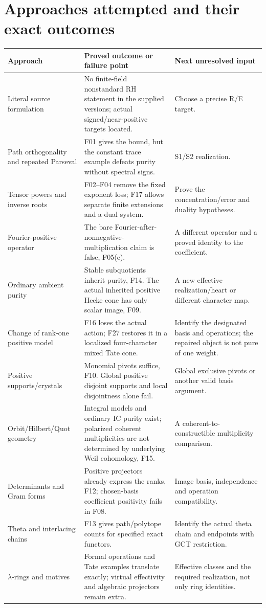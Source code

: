 \section{Approaches attempted and their exact outcomes}
{\small\begin{longtable}{p{.23\linewidth}p{.40\linewidth}p{.29\linewidth}}
\toprule Approach&Proved outcome or failure point&Next unresolved input\\\midrule\endhead
Literal source formulation&No finite-field nonstandard RH statement in the supplied versions; actual signed/near-positive targets located.&Choose a precise R/E target.\\
Path orthogonality and repeated Parseval&F01 gives the bound, but the constant trace example defeats purity without spectral signs.&S1/S2 realization.\\
Tensor powers and inverse roots&F02--F04 remove the fixed exponent loss; F17 allows separate finite extensions and a dual system.&Prove the concentration/error and duality hypotheses.\\
Fourier-positive operator&The bare Fourier-after-nonnegative-multiplication claim is false, F05(e).&A different operator and a proved identity to the coefficient.\\
Ordinary ambient purity&Stable subquotients inherit purity, F14. The actual inherited positive Hecke cone has only scalar image, F09.&A new effective realization/heart or different character map.\\
Change of rank-one positive model&F16 loses the actual action; F27 restores it in a localized four-character mixed Tate cone.&Identify the designated basis and operations; the repaired object is not pure of one weight.\\
Positive supports/crystals&Monomial pivots suffice, F10. Global positive disjoint supports and local disjointness alone fail.&Global exclusive pivots or another valid basis argument.\\
Orbit/Hilbert/Quot geometry&Integral models and ordinary IC purity exist; polarized coherent multiplicities are not determined by underlying Weil cohomology, F15.&A coherent-to-constructible multiplicity comparison.\\
Determinants and Gram forms&Positive projectors already express the ranks, F12; chosen-basis coefficient positivity fails in F08.&Image basis, independence and operation compatibility.\\
Theta and interlacing chains&F13 gives path/polytope counts for specified exact functors.&Identify the actual theta chain and endpoints with GCT restriction.\\
$\lambda$-rings and motives&Formal operations and Tate examples translate exactly; virtual effectivity and algebraic projectors remain extra.&Effective classes and the required realization, not only ring identities.\\\bottomrule
\end{longtable}}

